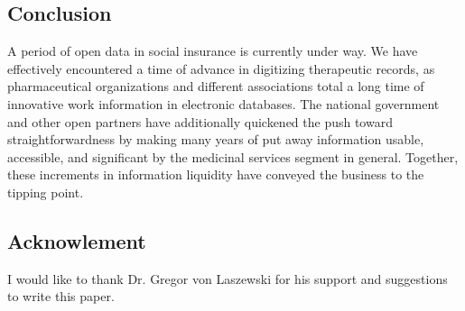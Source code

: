 \documentclass[sigconf]{acmart}
\begin{document}
   \maketitle
    \subsection{Conclusion}

A period of open data in social insurance is currently under way. We have effectively encountered a time of advance in digitizing therapeutic records, as pharmaceutical organizations and different associations total a long time of innovative work information in electronic databases. The national government and other open partners have additionally quickened the push toward straightforwardness by making many years of put away information usable, accessible, and significant by the medicinal services segment in general. Together, these increments in information liquidity have conveyed the business to the tipping point.



\maketitle
\subsection{Acknowlement}

  I would like to thank Dr. Gregor von Laszewski for his
  support and suggestions to write this paper.




    
    
    


    
    
    
    
\end{document}
